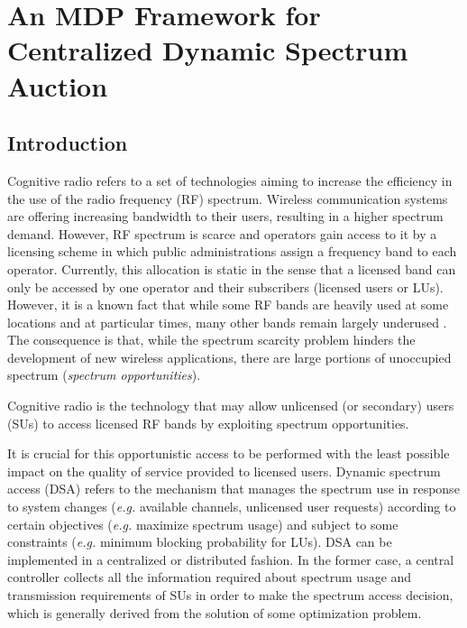 \graphicspath{ {img/Sarnoff/} }
\chapter{An MDP Framework for Centralized Dynamic Spectrum Auction}
\section{Introduction}
Cognitive radio refers to a set of technologies aiming to increase the efficiency in the use of the radio frequency (RF) spectrum.
Wireless communication systems are offering increasing bandwidth to their users, resulting in a higher spectrum demand. However, RF spectrum is scarce and operators gain access to it by a licensing scheme in which public administrations assign a frequency band to each operator. Currently, this allocation is static in the sense that a licensed band can only be accessed by one operator and their subscribers (licensed users or LUs).
However, it is a known fact that while some RF bands are heavily used at some locations and at particular times, many other bands remain largely underused \cite{ref:110}. 
The consequence is that, while the spectrum scarcity problem hinders the development of new wireless applications, there are large portions of unoccupied spectrum (\textit{spectrum opportunities}).

Cognitive radio is the technology that may allow unlicensed (or secondary) users (SUs) to access licensed RF bands by exploiting spectrum opportunities. 

It is crucial for this opportunistic access to be performed with the least possible impact on the quality of service provided to licensed users. 
Dynamic spectrum access (DSA) refers to the mechanism that manages the spectrum use in response to system changes (\textit{e.g.} available channels, unlicensed user requests) according to certain objectives (\textit{e.g.} maximize spectrum usage) and subject to some constraints (\textit{e.g.} minimum blocking probability for LUs). DSA can be implemented in a centralized or distributed fashion. In the former case, a central controller collects all the information required about spectrum usage and transmission requirements of SUs in order to make the spectrum access decision, which is generally derived from the solution of some optimization problem.

